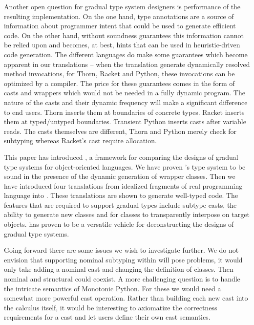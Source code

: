 \documentclass[acmlarge, anonymous, authordraft, review]{acmart} %
\begin{document}
Another open question for gradual type system designers is performance of
the resulting implementation. On the one hand, type annotations are a source
of information about programmer intent that could be used to generate
efficient code.  On the other hand, without soundness guarantees this
information cannot be relied upon and becomes, at best, hints that can be
used in heuristic-driven code generation.  The different languages do make
some guarantees which become apparent in our translations -- when the
translation generate dynamically resolved method invocations, for Thorn,
Racket and Python, these invocations can be optimized by a compiler. The
price for these guarantees comes in the form of casts and wrappers which
would not be needed in a fully dynamic program. The nature of the casts and
their dynamic frequency will make a significant difference to end users.
Thorn inserts them at boundaries of concrete types. Racket inserts them at
typed/untyped boundaries. Transient Python inserts casts after variable
reads. The casts themselves are different, Thorn and Python merely check for
subtyping whereas Racket's cast require allocation.

This paper has introduced \kafka, a framework for comparing the designs of
gradual type systems for object-oriented languages. We have proven \kafka's
type system to be sound in the presence of the dynamic generation of wrapper
classes. Then we have introduced four translations from idealized fragments
of real programming language into \kafka. These translations are shown to
generate well-typed \kafka code. The features that are required to support
gradual types include subtype casts, the ability to generate new classes and
for classes to transparently interpose on target objects. \kafka has proven
to be a versatile vehicle for deconstructing the designs of gradual type
systems.

Going forward there are some issues we wish to investigate further.  We do
not envision that supporting nominal subtyping within \kafka will pose
problems, it would only take adding a nominal cast and changing the
definition of classes. Then nominal and structural could coexist. A more
challenging question is to handle the intricate semantics of Monotonic
Python. For these we would need a somewhat more powerful cast operation.
Rather than building each new cast into the calculus itself, it would be
interesting to axiomatize the correctness requirements for a cast and let
users define their own cast semantics.



\end{document}
